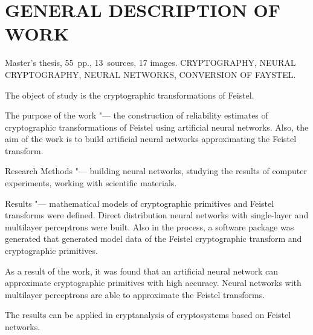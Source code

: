 \chapter*{GENERAL DESCRIPTION OF WORK}

Master's thesis, 55 pp., 13 sources, 17 images.
CRYPTOGRAPHY, NEURAL CRYPTOGRAPHY, NEURAL NETWORKS, CONVERSION OF FAYSTEL.
\bigskip

The object of study is the cryptographic transformations of Feistel.
\bigskip

The purpose of the work "--- the construction of reliability estimates of cryptographic transformations of Feistel using artificial neural networks.
Also, the aim of the work is to build artificial neural networks approximating the Feistel transform.
\bigskip

Research Methods "--- building neural networks, studying the results of computer experiments, working with scientific materials.
\bigskip

Results "--- mathematical models of cryptographic primitives and Feistel transforms were defined. Direct distribution neural networks with single-layer and multilayer perceptrons were built. Also in the process, a software package was generated that generated model data of the Feistel cryptographic transform and cryptographic primitives.
\bigskip

As a result of the work, it was found that an artificial neural network can approximate cryptographic primitives with high accuracy. 
Neural networks with multilayer perceptrons are able to approximate the Feistel transforms.

\bigskip
The results can be applied in cryptanalysis of cryptosystems based on Feistel networks.